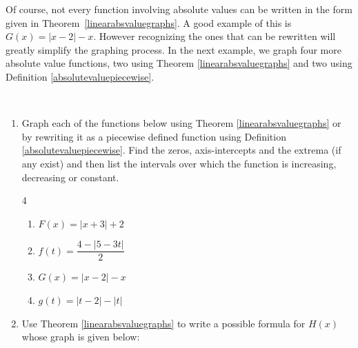 \documentclass{ximera}
\begin{document}
\medskip

Of course, not every function involving absolute values can be written in the form given in Theorem~\ref{linearabsvaluegraphs}. A good example of this is $G(x) = |x - 2| - x$.  However recognizing the ones that can be rewritten will greatly simplify the graphing process. In the next example, we graph four more absolute value functions, two using Theorem \ref{linearabsvaluegraphs} and two using Definition \ref{absolutevaluepiecewise}.

\enlargethispage{.05in}

\begin{example}   \label{absvaluegraph2} $~$

\begin {enumerate}

\item Graph each of the functions below using Theorem \ref{linearabsvaluegraphs} or by rewriting it as a piecewise defined function using Definition \ref{absolutevaluepiecewise}.  Find the zeros, axis-intercepts and the extrema (if any exist) and then list the intervals over which the function is increasing, decreasing or constant.

\setlength\columnsep{5pt}
\begin{multicols}{4}

\begin{enumerate}

\item  $F(x) = |x + 3| + 2$ 

\item  $f(t) = \dfrac{4 - |5 - 3t|}{2}$ 

\item  $G(x) = |x - 2| - x$ 

\item $g(t) = |t - 2| - |t|$ 

\end{enumerate}

\end{multicols}
\setlength\columnsep{10pt}

\pagebreak

\item \label{absfunctionfromgraph} Use Theorem  \ref{linearabsvaluegraphs} to write a possible formula for $H(x)$ whose graph is given below:


\end{enumerate}
\end{example}
\end{document}
